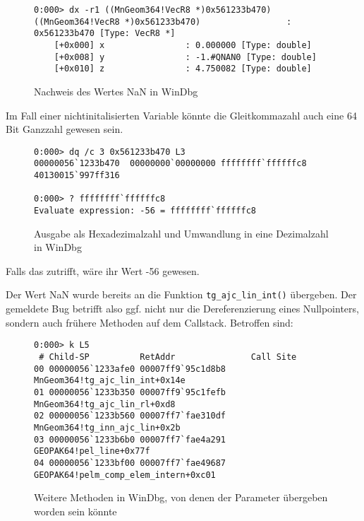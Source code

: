 \begin{figure}[H]
\begin{lstlisting}
0:000> dx -r1 ((MnGeom364!VecR8 *)0x561233b470)
((MnGeom364!VecR8 *)0x561233b470)                 : 0x561233b470 [Type: VecR8 *]
    [+0x000] x                : 0.000000 [Type: double]
    [+0x008] y                : -1.#QNAN0 [Type: double]
    [+0x010] z                : 4.750082 [Type: double]
\end{lstlisting}
\caption{Nachweis des Wertes NaN in WinDbg}
\end{figure}

Im Fall einer nichtinitalisierten Variable könnte die Gleitkommazahl auch eine 64 Bit Ganzzahl gewesen sein.

\begin{figure}[H]
\begin{lstlisting}
0:000> dq /c 3 0x561233b470 L3
00000056`1233b470  00000000`00000000 ffffffff`ffffffc8 40130015`997ff316

0:000> ? ffffffff`ffffffc8
Evaluate expression: -56 = ffffffff`ffffffc8
\end{lstlisting}
\caption{Ausgabe als Hexadezimalzahl und Umwandlung in eine Dezimalzahl in WinDbg}
\end{figure}

Falls das zutrifft, wäre ihr Wert -56 gewesen.

Der Wert NaN wurde bereits an die Funktion \verb|tg_ajc_lin_int()| übergeben. Der gemeldete Bug betrifft also ggf. nicht nur die Dereferenzierung eines Nullpointers, sondern auch frühere Methoden auf dem Callstack. Betroffen sind:

\begin{figure}[H]
\begin{lstlisting}
0:000> k L5
 # Child-SP          RetAddr               Call Site
00 00000056`1233afe0 00007ff9`95c1d8b8     MnGeom364!tg_ajc_lin_int+0x14e
01 00000056`1233b350 00007ff9`95c1fefb     MnGeom364!tg_ajc_lin_rl+0xd8
02 00000056`1233b560 00007ff7`fae310df     MnGeom364!tg_inn_ajc_lin+0x2b
03 00000056`1233b6b0 00007ff7`fae4a291     GEOPAK64!pel_line+0x77f
04 00000056`1233bf00 00007ff7`fae49687     GEOPAK64!pelm_comp_elem_intern+0xc01
\end{lstlisting}
\caption{Weitere Methoden in WinDbg, von denen der Parameter übergeben worden sein könnte}
\end{figure}


